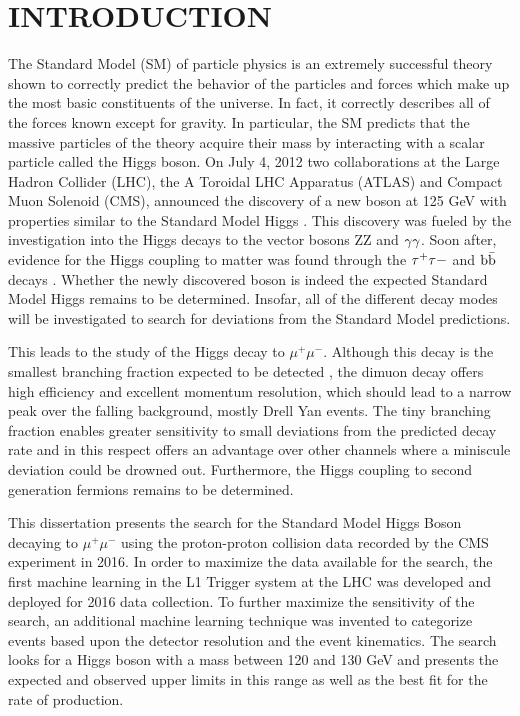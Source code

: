 \chapter{INTRODUCTION} \label{intro}

The Standard Model (SM) of particle physics is an extremely successful theory shown to correctly predict the behavior of the particles and forces which make up the most basic constituents of the universe. In fact, it correctly describes all of the forces known except for gravity. In particular, the SM predicts that the massive particles of the theory acquire their mass by interacting with a scalar particle called the Higgs boson. On July 4, 2012 two collaborations at the Large Hadron Collider (LHC), the A Toroidal LHC Apparatus (ATLAS) and Compact Muon Solenoid (CMS), announced the discovery of a new boson at 125 GeV with properties similar to the Standard Model Higgs \cite{atlasdiscovery,cmsdiscovery2012,cmsdiscovery2013}. This discovery was fueled by the investigation into the Higgs decays to the vector bosons ZZ and ${\rm \gamma\gamma}$. Soon after, evidence for the Higgs coupling to matter was found through the ${\rm \tau^{+}\tau{-}}$ and ${\rm b\bar{b}}$ decays \cite{cmshiggstau,cmshiggsbb,cmshiggsferm,atlashiggsbb}. Whether the newly discovered boson is indeed the expected Standard Model Higgs remains to be determined. Insofar, all of the different decay modes will be investigated to search for deviations from the Standard Model predictions.

This leads to the study of the Higgs decay to $\mu^{+}\mu^{-}$. Although this decay is the smallest branching fraction expected to be detected \cite{smallestbranch1,smallestbranch2}, the dimuon decay offers high efficiency and excellent momentum resolution, which should lead to a narrow peak over the falling background, mostly Drell Yan events. The tiny branching fraction enables greater sensitivity to small deviations from the predicted decay rate and in this respect offers an advantage over other channels where a miniscule deviation could be drowned out. Furthermore, the Higgs coupling to second generation fermions remains to be determined. 

This dissertation presents the search for the Standard Model Higgs Boson decaying to $\mu^{+}\mu^{-}$ using the proton-proton collision data recorded by the CMS experiment in 2016. In order to maximize the data available for the search, the first machine learning in the L1 Trigger system at the LHC was developed and deployed for 2016 data collection. To further maximize the sensitivity of the search, an additional machine learning technique was invented to categorize events based upon the detector resolution and the event kinematics. The search looks for a Higgs boson with a mass between 120 and 130 GeV and presents the expected and observed upper limits in this range as well as the best fit for the rate of production.  

